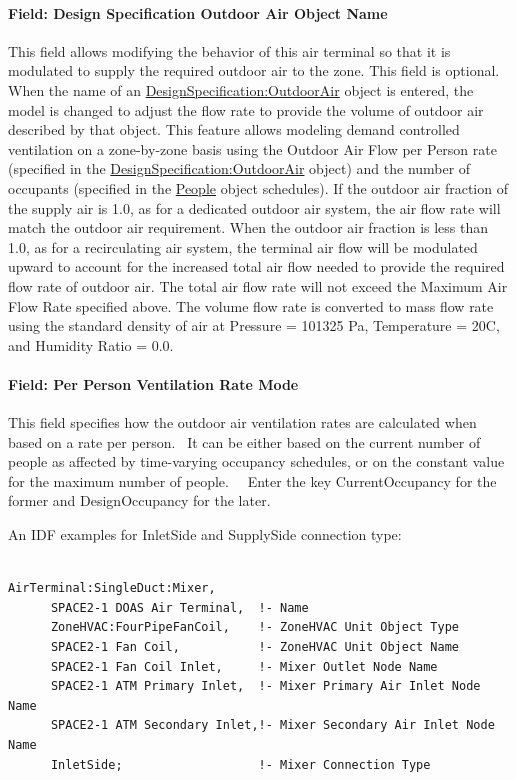 \paragraph{Field: Design Specification Outdoor Air Object Name}\label{field-DSOA-object-name}

This field allows modifying the behavior of this air terminal so that it is modulated to supply the required outdoor air to the zone.  This field is optional. When the name of an \hyperref[designspecificationoutdoorair]{DesignSpecification:OutdoorAir} object is entered, the model is changed to adjust the flow rate to provide the volume of outdoor air described by that object.  This feature allows modeling demand controlled ventilation on a zone-by-zone basis using the Outdoor Air Flow per Person rate (specified in the \hyperref[designspecificationoutdoorair]{DesignSpecification:OutdoorAir} object) and the number of occupants (specified in the \hyperref[people]{People} object schedules).  If the outdoor air fraction of the supply air is 1.0, as for a dedicated outdoor air system, the air flow rate will match the outdoor air requirement.  When the outdoor air fraction is less than 1.0, as for a recirculating air system, the terminal air flow will be modulated upward to account for the increased total air flow needed to provide the required flow rate of outdoor air.   The total air flow rate will not exceed the Maximum Air Flow Rate specified above. The volume flow rate is converted to mass flow rate using the standard density of air at Pressure = 101325 Pa, Temperature = 20C, and Humidity Ratio = 0.0.

\paragraph{Field: Per Person Ventilation Rate Mode}

This field specifies how the outdoor air ventilation rates are calculated when based on a rate per person.~ It can be either based on the current number of people as affected by time-varying occupancy schedules, or on the constant value for the maximum number of people.~~ Enter the key CurrentOccupancy for the former and DesignOccupancy for the later.

An IDF examples for InletSide and SupplySide connection type:

\begin{lstlisting}

AirTerminal:SingleDuct:Mixer,
      SPACE2-1 DOAS Air Terminal,  !- Name
      ZoneHVAC:FourPipeFanCoil,    !- ZoneHVAC Unit Object Type
      SPACE2-1 Fan Coil,           !- ZoneHVAC Unit Object Name
      SPACE2-1 Fan Coil Inlet,     !- Mixer Outlet Node Name
      SPACE2-1 ATM Primary Inlet,  !- Mixer Primary Air Inlet Node Name
      SPACE2-1 ATM Secondary Inlet,!- Mixer Secondary Air Inlet Node Name
      InletSide;                   !- Mixer Connection Type
\end{lstlisting}

